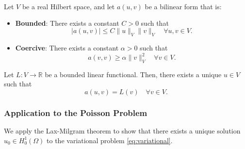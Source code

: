 \documentclass[class=article, crop=false]{standalone}
\begin{document}
\begin{theorem}
    Let $V$ be a real Hilbert space, and let $a(u,v)$ be a bilinear form that is:
    \begin{itemize}
        \item \textbf{Bounded}: There exists a constant $C > 0$ such that
        \[
        |a(u, v)| \leq C \|u\|_V \|v\|_V \quad \forall u, v \in V.
        \]
        \item \textbf{Coercive}: There exists a constant $\alpha > 0$ such that
        \[
        a(v, v) \geq \alpha \|v\|_V^2 \quad \forall v \in V.
        \]
    \end{itemize}
    Let $L: V \rightarrow \mathbb{R}$ be a bounded linear functional. Then, there exists a unique $u \in V$ such that
    \[
    a(u, v) = L(v) \quad \forall v \in V.
    \]
\end{theorem}

\subsubsection{Application to the Poisson Problem}

We apply the Lax-Milgram theorem to show that there exists a unique solution $u_0 \in H^1_0(\Omega)$ to the variational problem \eqref{eq:variational}.
\end{document}
